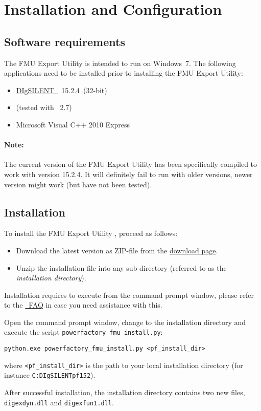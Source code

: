 \chapter{Installation and Configuration}

\section{Software requirements}

The \fmipp \pf FMU Export Utility is intended to run on Windows~7. The following applications need to be installed prior to installing the \fmipp \pf FMU Export Utility:
\begin{itemize}
  \item \href{http://www.digsilent.com/}{DIgSILENT~\pf}~15.2.4~(32-bit)
  \item \href{https://www.python.org/}{\python} (tested with \python~2.7)
  \item Microsoft Visual C++ 2010 Express
\end{itemize}

\subsubsection*{Note:}
The current version of the \fmipp \pf FMU Export Utility has been specifically compiled to work with \pf version 15.2.4.
It will definitely fail to run with older versions, newer version might work (but have not been tested).


\section{Installation}
\label{sec:install}

To install the \fmipp \pf FMU Export Utility , proceed as follows:
\begin{itemize}
  \item Download the latest version as ZIP-file from the \href{http://sourceforge.net/projects/powerfactory-fmu/files/latest/download}{download page}.
  \item Unzip the installation file into any sub directory (referred to as the \emph{installation directory}).
\end{itemize}

Installation requires to execute \python from the command prompt window, please refer to the \href{https://docs.python.org/2/faq/windows.html}{\python~FAQ} in case you need assistance with this.

Open the command prompt window, change to the installation directory and execute the script \texttt{powerfactory\_fmu\_install.py}:
\begin{verbatim}
python.exe powerfactory_fmu_install.py <pf_install_dir>
\end{verbatim}
where \texttt{<pf\_install\_dir>} is the path to your local \pf installation directory (for instance \texttt{C:DIgSILENTpf152}).

After successful installation, the \pf installation directory contains two new files, \texttt{digexdyn.dll} and \texttt{digexfun1.dll}.
